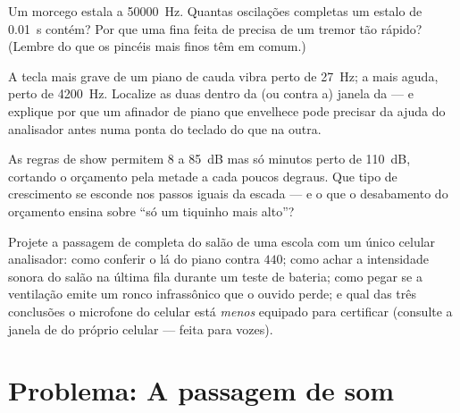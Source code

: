 \begin{exercise}[$\star\star$]\label{exo:g8:sound-pitch-loudness:9}
Um morcego estala a \qty{50000}{Hz}. Quantas oscilações completas um
estalo de \qty{0.01}{s} contém? Por que uma  fina feita de 
precisa de um tremor tão rápido? (Lembre do que os pincéis mais finos
têm em comum.)
\end{exercise}

\begin{exercise}[$\star\star$]\label{exo:g8:sound-pitch-loudness:10}
A tecla mais grave de um piano de cauda vibra perto de \qty{27}{Hz};
a mais aguda, perto de \qty{4200}{Hz}. Localize as duas dentro da (ou
contra a) janela da  --- e explique por que um afinador de
piano que envelhece pode precisar da ajuda do analisador antes numa
ponta do teclado do que na outra.
\end{exercise}

\begin{exercise}[$\star\star$]\label{exo:g8:sound-pitch-loudness:11}
As regras de show permitem $8$  a \qty{85}{dB} mas só minutos
perto de \qty{110}{dB}, cortando o orçamento pela metade a cada poucos
degraus. Que tipo de crescimento se esconde nos passos iguais da
escada --- e o que o desabamento do orçamento ensina sobre ``só um
tiquinho mais alto''?
\end{exercise}

\begin{exercise}[$\star\star\star$]\label{exo:g8:sound-pitch-loudness:12}
Projete a passagem de  completa do salão de uma escola com um
único celular analisador: como conferir o lá do piano contra $440$;
como achar a intensidade sonora do salão na última fila durante um
teste de bateria; como pegar se a ventilação emite um ronco
infrassônico que o ouvido perde; e qual das três conclusões o
microfone do celular está \emph{menos} equipado para certificar
(consulte a janela de  do próprio celular --- feita para
vozes).
\end{exercise}

\section{Problema: A passagem de som}

